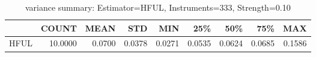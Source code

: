 \begin{table}[ht]
\centering
\caption{variance summary: Estimator=HFUL, Instruments=333, Strength=0.10}
\begin{tabular}{lrrrrrrrr}
\toprule
 & COUNT & MEAN & STD & MIN & 25\% & 50\% & 75\% & MAX \\
\midrule
HFUL & 10.0000 & 0.0700 & 0.0378 & 0.0271 & 0.0535 & 0.0624 & 0.0685 & 0.1586 \\
\bottomrule
\end{tabular}
\end{table}
